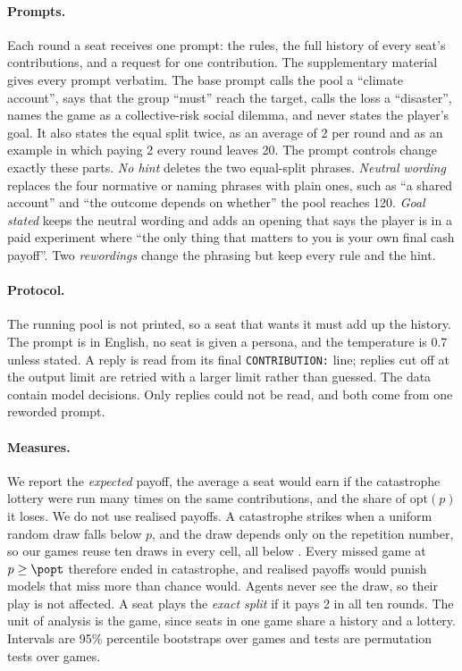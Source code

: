 \paragraph{Prompts.}
Each round a seat receives one prompt: the rules, the full history of every seat's
contributions, and a request for one contribution. The supplementary material gives every
prompt verbatim. The base prompt calls the pool a ``climate account'', says that the group
``must'' reach the target, calls the loss a ``disaster'', names the game as a collective-risk
social dilemma, and never states the player's goal. It also states the equal split twice, as
an average of 2 per round and as an example in which paying 2 every round leaves 20. The
prompt controls change exactly these parts. \emph{No hint} deletes the two equal-split
phrases. \emph{Neutral wording} replaces the four normative or naming phrases with plain
ones, such as ``a shared account'' and ``the outcome depends on whether'' the pool reaches
120. \emph{Goal stated} keeps the neutral wording and adds an opening that says the player
is in a paid experiment where ``the only thing that matters to you is your own final cash
payoff''. Two \emph{rewordings} change the phrasing but keep every rule and the hint.

\paragraph{Protocol.}
The running pool is not printed, so a seat that wants it must add up the history. The
prompt is in English, no seat
is given a persona, and the temperature is 0.7 unless stated. A reply is read from its final
\texttt{CONTRIBUTION:} line; replies cut off at the output limit are retried with a larger
limit rather than guessed. The data contain \CntDecisions{} model decisions. Only
\CntParseFail{} replies could not be read, and both come from one reworded prompt.

\paragraph{Measures.}
We report the \emph{expected} payoff, the average a seat would earn if the catastrophe
lottery were run many times on the same contributions, and the share of $\mathrm{opt}(p)$ it
loses. We do not use realised payoffs. A catastrophe strikes when a uniform random draw falls
below $p$, and the draw depends only on the repetition number, so our games reuse ten draws in
every cell, all below \LotMaxDraw{}. Every missed game at $p\ge\popt$ therefore ended in
catastrophe, and realised payoffs would punish models that miss more than chance would.
Agents never see the draw, so their play is not affected. A seat plays the \emph{exact split}
if it pays 2 in all ten rounds. The unit of analysis is the game, since seats in one game
share a history and a lottery. Intervals are 95\% percentile bootstraps over games and tests
are permutation tests over games.
